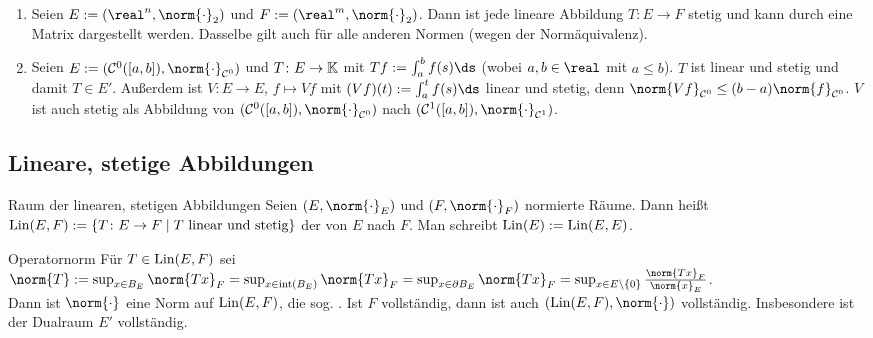\begin{Bsp}
    \begin{enumerate}[label=\emph{(\alph*)}]
        \item
        Seien $E := (\real^n, \norm{\cdot}_2)$ und $F := (\real^m, \norm{\cdot}_2)$.
        Dann ist jede lineare Abbildung $T\colon E \rightarrow F$ stetig und kann
        durch eine Matrix dargestellt werden.
        Dasselbe gilt auch für alle anderen Normen (wegen der Normäquivalenz).
        
        \item
        Seien $E := (\C^0([a, b]), \norm{\cdot}_{\C^0})$ und $T\colon E \rightarrow \mathbb{K}$
        mit $Tf := \int_a^b f(s)\ds$ (wobei $a, b \in \real$ mit $a \le b$).
        $T$ ist linear und stetig und damit $T \in E'$.
        Außerdem ist $V\colon E \rightarrow E$, $f \mapsto Vf$ mit
        $(Vf)(t) := \int_a^t f(s)\ds$ linear und stetig, denn
        $\norm{Vf}_{\C^0} \le (b - a) \norm{f}_{\C^0}$.
        $V$ ist auch stetig als Abbildung von
        $(\C^0([a, b]), \norm{\cdot}_{\C^0})$ nach
        $(\C^1([a, b]), \norm{\cdot}_{\C^1})$.
    \end{enumerate}
\end{Bsp}

\pagebreak

\subsection{%
    Lineare, stetige Abbildungen%
}

\begin{Def}{Raum der linearen, stetigen Abbildungen}
    Seien $(E, \norm{\cdot}_E)$ und $(F, \norm{\cdot}_F)$ normierte Räume.
    Dann heißt
    $\operatorname{Lin}(E, F) := \{T\colon E \rightarrow F \;|\; T \text{ linear und stetig}\}$
    der  von $E$ nach $F$.
    Man schreibt $\operatorname{Lin}(E) := \operatorname{Lin}(E, E)$.
\end{Def}

\begin{Satz}{Operatornorm}
    Für $T \in \operatorname{Lin}(E, F)$ sei\\
    $\norm{T} := \sup_{x \in B_E} \norm{Tx}_F =
    \sup_{x \in \interior{B_E}} \norm{Tx}_F = \sup_{x \in \partial B_E} \norm{Tx}_F =
    \sup_{x \in E \setminus \{0\}} \frac{\norm{Tx}_F}{\norm{x}_E}$.\\
    Dann ist $\norm{\cdot}$ eine Norm auf $\operatorname{Lin}(E, F)$, die sog. .
    Ist $F$ vollständig, dann ist auch $(\Lin(E, F), \norm{\cdot})$ vollständig.
    Insbesondere ist der Dualraum $E'$ vollständig.
\end{Satz}

